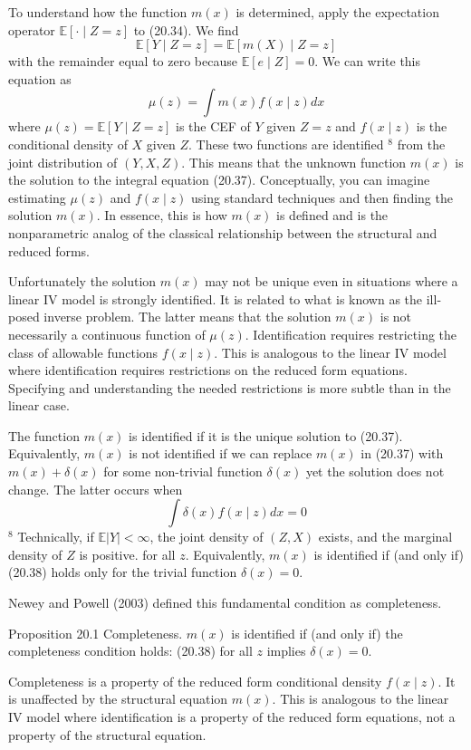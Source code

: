 \documentclass[10pt]{article}
\begin{document}
To understand how the function $m(x)$ is determined, apply the expectation operator $\mathbb{E}[\cdot \mid Z=z]$ to (20.34). We find
$$
\mathbb{E}[Y \mid Z=z]=\mathbb{E}[m(X) \mid Z=z]
$$
with the remainder equal to zero because $\mathbb{E}[e \mid Z]=0$. We can write this equation as
$$
\mu(z)=\int m(x) f(x \mid z) d x
$$
where $\mu(z)=\mathbb{E}[Y \mid Z=z]$ is the CEF of $Y$ given $Z=z$ and $f(x \mid z)$ is the conditional density of $X$ given $Z$. These two functions are identified ${ }^{8}$ from the joint distribution of $(Y, X, Z)$. This means that the unknown function $m(x)$ is the solution to the integral equation (20.37). Conceptually, you can imagine estimating $\mu(z)$ and $f(x \mid z)$ using standard techniques and then finding the solution $m(x)$. In essence, this is how $m(x)$ is defined and is the nonparametric analog of the classical relationship between the structural and reduced forms.

Unfortunately the solution $m(x)$ may not be unique even in situations where a linear IV model is strongly identified. It is related to what is known as the ill-posed inverse problem. The latter means that the solution $m(x)$ is not necessarily a continuous function of $\mu(z)$. Identification requires restricting the class of allowable functions $f(x \mid z)$. This is analogous to the linear IV model where identification requires restrictions on the reduced form equations. Specifying and understanding the needed restrictions is more subtle than in the linear case.

The function $m(x)$ is identified if it is the unique solution to (20.37). Equivalently, $m(x)$ is not identified if we can replace $m(x)$ in (20.37) with $m(x)+\delta(x)$ for some non-trivial function $\delta(x)$ yet the solution does not change. The latter occurs when
$$
\int \delta(x) f(x \mid z) d x=0
$$
${ }^{8}$ Technically, if $\mathbb{E}|Y|<\infty$, the joint density of $(Z, X)$ exists, and the marginal density of $Z$ is positive. for all $z$. Equivalently, $m(x)$ is identified if (and only if) (20.38) holds only for the trivial function $\delta(x)=0$.

Newey and Powell (2003) defined this fundamental condition as completeness.

Proposition 20.1 Completeness. $m(x)$ is identified if (and only if) the completeness condition holds: (20.38) for all $z$ implies $\delta(x)=0$.

Completeness is a property of the reduced form conditional density $f(x \mid z)$. It is unaffected by the structural equation $m(x)$. This is analogous to the linear IV model where identification is a property of the reduced form equations, not a property of the structural equation.
\end{document}
